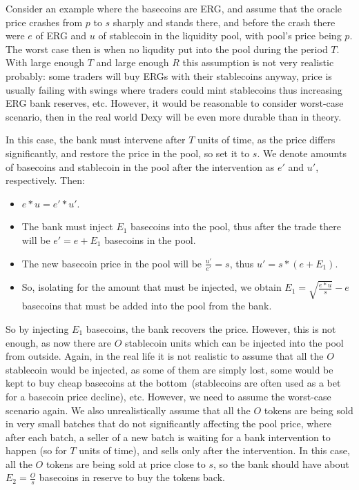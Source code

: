 \documentclass[a4paper,UKenglish,cleveref, autoref, thm-restate]{lipics-v2021}
\newcommand{\bc}{ERG}
\newcommand{\sct}{stablecoin}
\newcommand{\dx}{Dexy}
\begin{document}
Consider an example where the basecoins are \bc{}, and assume that the oracle price crashes from $p$ to $s$ sharply and stands there, and before the crash there were $e$ of \bc{} and $u$ of \sct{} in the liquidity pool, with pool's price being $p$. The worst case then is when no liqudity put into the pool during the period $T$. With large enough $T$ and large enough $R$ this assumption is not very realistic probably: some traders will buy \bc{}s with their \sct{}s anyway, price is usually failing with swings where traders could mint \sct{}s thus increasing \bc{} bank reserves, etc. However, it would be reasonable to consider worst-case scenario, then in the real world \dx{} will be even more durable than in theory. 

In this case, the bank must intervene after $T$ units of time, as the price differs significantly, and restore the price in the pool, so set it to $s$. We denote amounts of basecoins and \sct{} in the pool after the intervention as $e'$ and $u'$, respectively. Then:

\begin{itemize}
  \item{} $e * u = e' * u'$.
  \item{} The bank must inject $E_1$ basecoins into the pool, thus after the trade there will be $e' = e + E_1$ basecoins in the pool.
  \item{} The new basecoin price in the pool will be $\frac{u'}{e'} = s$, thus $u' = s * (e + E_1)$.
  \item{} So, isolating for the amount that must be injected, we obtain $E_1 = \sqrt{\frac{e * u}{s}} - e$ basecoins that must be added into the pool from the bank.
\end{itemize}

So by injecting $E_1$ basecoins, the bank recovers the price. However, this is not enough, as now there are $O$ \sct{} units which can be injected into the pool from outside. 
Again, in the real life it is not realistic to assume that all the $O$ \sct{} would be injected, as some of them are simply lost, some would be kept to buy cheap basecoins at the bottom~(\sct{}s are often used as a bet for a basecoin price decline), etc. However, we need to assume the worst-case scenario again. We also unrealistically assume that all the $O$ tokens are being sold in very small batches that do not significantly affecting the pool price, where after each batch, a seller of a new batch is waiting for a bank intervention to happen (so for $T$ units of time), and sells only after the intervention. In this case, all the $O$ tokens are being sold at price close to $s$, so the bank should have about $E_2 = \frac{O}{s}$ basecoins in reserve to buy the tokens back.
\end{document}
